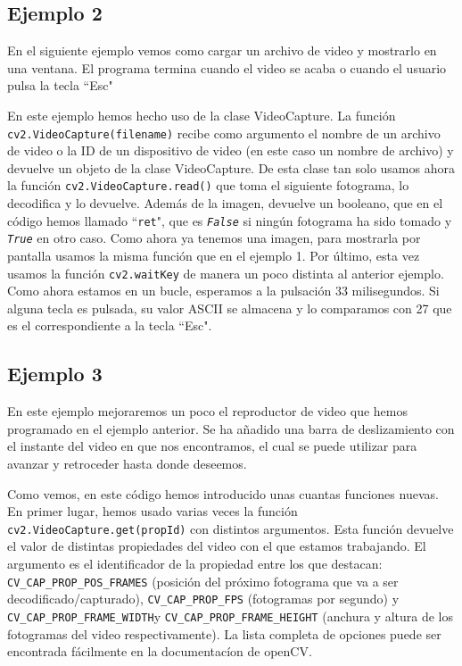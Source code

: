 \documentclass[a4paper,openright, 12pt]{book}
\begin{document}
\subsection*{Ejemplo 2}
En el siguiente ejemplo vemos como cargar un archivo de video y mostrarlo en una ventana. El programa termina cuando el video se acaba o cuando el usuario pulsa la tecla ``Esc"

En este ejemplo hemos hecho uso de la clase VideoCapture.
La función \lstinline|cv2.VideoCapture(filename)| recibe como argumento el nombre de un archivo de video o la ID de un dispositivo de video (en este caso un nombre de archivo) y devuelve un objeto de la clase VideoCapture.
De esta clase tan solo usamos ahora la función \lstinline|cv2.VideoCapture.read()| que toma el siguiente fotograma, lo decodifica y lo devuelve. Además de la imagen, devuelve un booleano, que en el código hemos llamado ``\lstinline|ret|", que es \textit{\lstinline|False|} si ningún fotograma ha sido tomado y \textit{\lstinline|True|} en otro caso.
Como ahora ya tenemos una imagen, para mostrarla por pantalla usamos la misma función que en el ejemplo 1.
Por último, esta vez usamos la función \lstinline|cv2.waitKey| de manera un poco distinta al anterior ejemplo. Como ahora estamos en un bucle, esperamos a la pulsación 33 milisegundos. Si alguna tecla es pulsada, su valor ASCII se almacena y lo comparamos con 27 que es el correspondiente a la tecla ``Esc".

\newpage
\subsection*{Ejemplo 3}
En este ejemplo mejoraremos un poco el reproductor de video que hemos programado en el ejemplo anterior. Se ha añadido una barra de deslizamiento con el instante del video en que nos encontramos, el cual se puede utilizar para avanzar y retroceder hasta donde deseemos.

Como vemos, en este código hemos introducido unas cuantas funciones nuevas.
En primer lugar, hemos usado varias veces la función \lstinline|cv2.VideoCapture.get(propId)| con distintos argumentos.
Esta función devuelve el valor de distintas propiedades del video con el que estamos trabajando. El argumento es el identificador de la propiedad entre los que destacan: \lstinline|CV_CAP_PROP_POS_FRAMES| (posición del próximo fotograma que va a ser decodificado/capturado), \lstinline|CV_CAP_PROP_FPS| (fotogramas por segundo) y \lstinline|CV_CAP_PROP_FRAME_WIDTH|y \lstinline|CV_CAP_PROP_FRAME_HEIGHT| (anchura y altura de los fotogramas del video respectivamente).
La lista completa de opciones puede ser encontrada fácilmente en la documentacíon de openCV.
\end{document}
